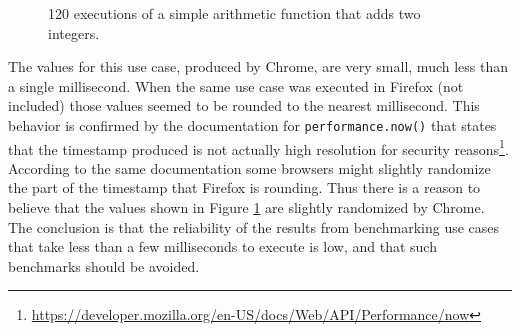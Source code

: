 \begin{figure}[!h]%
\centering
{}%
{}%
\caption{120 executions of a simple arithmetic function that adds two integers.}%
\label{arithmetic-add-10000-1}%
\end{figure}

The values for this use case, produced by Chrome, are very small, much less than a single millisecond. When the same use case was executed in Firefox (not included) those values seemed to be rounded to the nearest millisecond. This behavior is confirmed by the documentation for \texttt{performance.now()} that states that the timestamp produced is not actually high resolution for security reasons\footnote{\url{https://developer.mozilla.org/en-US/docs/Web/API/Performance/now}}. According to the same documentation some browsers might slightly randomize the part of the timestamp that Firefox is rounding. Thus there is a reason to believe that the values shown in Figure \ref{arithmetic-add-10000-1} are slightly randomized by Chrome. The conclusion is that the reliability of the results from benchmarking use cases that take less than a few milliseconds to execute is low, and that such benchmarks should be avoided.

